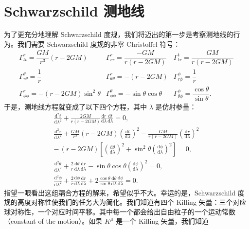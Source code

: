 \section{Schwarzschild 测地线}

为了更充分地理解 Schwarzschild 度规，我们将迈出的第一步是考察测地线的行为。我们需要 Schwarzschild 度规的非零 Christoffel 符号：
\begin{equation*}
\begin{array}{lll}
\Gamma^r_{tt} = \dfrac{GM}{r^3}(r-2GM) & \Gamma^r_{rr} = \dfrac{-GM}{r(r-2GM)} & \Gamma^t_{tr} = \dfrac{GM}{r(r-2GM)}\\[10pt]
\Gamma^\theta_{r\theta} = \dfrac{1}{r} & \Gamma^r_{\theta\theta} = -(r-2GM) & \Gamma^\phi_{r\phi} = \dfrac{1}{r}\\[10pt]
\Gamma^r_{\phi\phi} = -(r-2GM)\sin^2\theta & \Gamma^\theta_{\phi\phi} = -\sin\theta\cos\theta & \Gamma^\phi_{\theta\phi} = \dfrac{\cos\theta}{\sin\theta}.
\end{array}
\tag{5.52}
\end{equation*}
于是，测地线方程就变成了以下四个方程，其中 $\lambda$ 是仿射参量：
\begin{gather*}
\frac{\mathrm{d}^2 t}{\mathrm{d}\lambda^2} + \frac{2GM}{r(r-2GM)}\frac{\mathrm{d}r}{\mathrm{d}\lambda}\frac{\mathrm{d}t}{\mathrm{d}\lambda} = 0,\\[8pt]
\frac{\mathrm{d}^2 r}{\mathrm{d}\lambda^2} + \frac{GM}{r^3}(r-2GM)\left(\frac{\mathrm{d}t}{\mathrm{d}\lambda}\right)^2 - \frac{GM}{r(r-2GM)}\left(\frac{\mathrm{d}r}{\mathrm{d}\lambda}\right)^2\\[2pt]
-\,(r-2GM)\left[\left(\frac{\mathrm{d}\theta}{\mathrm{d}\lambda}\right)^2 + \sin^2\theta\left(\frac{\mathrm{d}\phi}{\mathrm{d}\lambda}\right)^2\right] = 0,\\[8pt]
\frac{\mathrm{d}^2\theta}{\mathrm{d}\lambda^2} + \frac{2}{r}\frac{\mathrm{d}\theta}{\mathrm{d}\lambda}\frac{\mathrm{d}r}{\mathrm{d}\lambda} - \sin\theta\cos\theta\left(\frac{\mathrm{d}\phi}{\mathrm{d}\lambda}\right)^2 = 0,\\[8pt]
\frac{\mathrm{d}^2\phi}{\mathrm{d}\lambda^2} + \frac{2}{r}\frac{\mathrm{d}\phi}{\mathrm{d}\lambda}\frac{\mathrm{d}r}{\mathrm{d}\lambda} + 2\frac{\cos\theta}{\sin\theta}\frac{\mathrm{d}\theta}{\mathrm{d}\lambda}\frac{\mathrm{d}\phi}{\mathrm{d}\lambda} = 0.
\tag{5.53}
\end{gather*}
指望一眼看出这组耦合方程的解来，希望似乎不大。幸运的是，Schwarzschild 度规的高度对称性使我们的任务大为简化。我们知道有四个 Killing 矢量：三个对应球对称性，一个对应时间平移。其中每一个都会给出自由粒子的一个运动常数（constant of the motion）。如果 $K^\mu$ 是一个 Killing 矢量，我们知道
